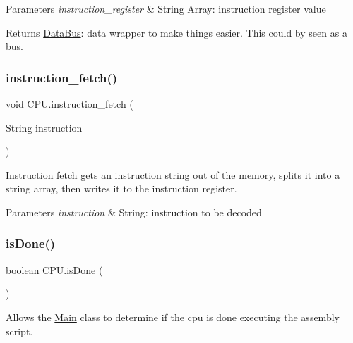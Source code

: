 \begin{DoxyParams}{Parameters}
{\em instruction\+\_\+register} & String Array\+: instruction register value \\
\hline
\end{DoxyParams}
\begin{DoxyReturn}{Returns}
\mbox{\hyperlink{class_data_bus}{Data\+Bus}}\+: data wrapper to make things easier. This could by seen as a bus. 
\end{DoxyReturn}
\mbox{\label{class_c_p_u_a23d225d9e85ee08b1084782d2702f62e}} 
\subsubsection{\texorpdfstring{instruction\+\_\+fetch()}{instruction\_fetch()}}
{\footnotesize\ttfamily void C\+P\+U.\+instruction\+\_\+fetch (\begin{DoxyParamCaption}\item[{String}]{instruction }\end{DoxyParamCaption})\hspace{0.3cm}{\ttfamily [private]}}

Instruction fetch gets an instruction string out of the memory, splits it into a string array, then writes it to the instruction register.


\begin{DoxyParams}{Parameters}
{\em instruction} & String\+: instruction to be decoded \\
\hline
\end{DoxyParams}
\mbox{\label{class_c_p_u_aef889eba6973e62664310a5ef8f9654d}} 
\subsubsection{\texorpdfstring{is\+Done()}{isDone()}}
{\footnotesize\ttfamily boolean C\+P\+U.\+is\+Done (\begin{DoxyParamCaption}{ }\end{DoxyParamCaption})\hspace{0.3cm}{\ttfamily [package]}}

Allows the \mbox{\hyperlink{class_main}{Main}} class to determine if the cpu is done executing the assembly script.

